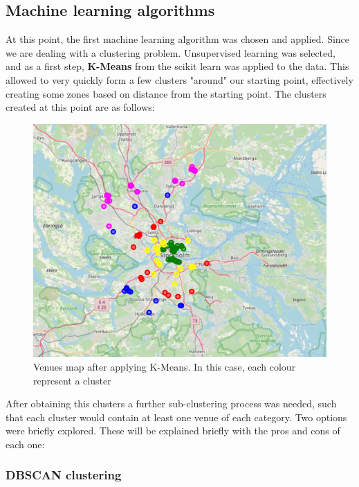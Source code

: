 \documentclass{article}
\begin{document}
	\subsection{Machine learning algorithms}
		At this point, the first machine learning algorithm was chosen and applied. Since we are dealing with a clustering problem. Unsupervised learning was selected, and as a first step, \textbf{K-Means} from the scikit learn was applied to the data. This allowed to very quickly form a few clusters "around" our starting point, effectively creating some zones based on distance from the starting point. The clusters created at this point are as follows:
		\begin{figure}[H]
			\centering
			\includegraphics[width=\textwidth]{img/map2.jpg}
			\caption{Venues map after applying K-Means. In this case, each colour represent a cluster}
			\label{fig::map2}
		\end{figure}
		
		After obtaining this clusters a further sub-clustering process was needed, such that each cluster would contain at least one venue of each category. Two options were briefly explored. These will be explained briefly with the pros and cons of each one:
		
		\subsubsection{DBSCAN clustering}
		
\end{document}
